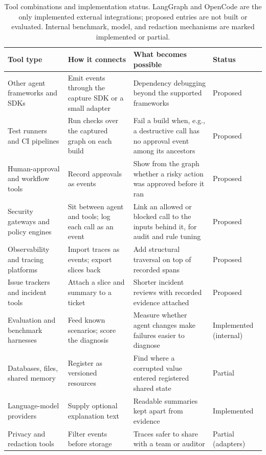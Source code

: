 \documentclass[11pt]{article}
\begin{document}
\begin{table}[h]
\centering\small
\begin{tabularx}{\linewidth}{@{}>{\raggedright\arraybackslash}p{2.4cm}>{\raggedright\arraybackslash}p{4.0cm}>{\raggedright\arraybackslash}p{4.3cm}>{\raggedright\arraybackslash}p{1.8cm}@{}}
\toprule
\textbf{Tool type} & \textbf{How it connects} & \textbf{What becomes possible} & \textbf{Status}\\
\midrule
Other agent frameworks and SDKs & Emit events through the capture SDK or a small adapter & Dependency debugging beyond the supported frameworks & Proposed\\
Test runners and CI pipelines & Run checks over the captured graph on each build & Fail a build when, e.g., a destructive call has no approval event among its ancestors & Proposed\\
Human-approval and workflow tools & Record approvals as events & Show from the graph whether a risky action was approved before it ran & Proposed\\
Security gateways and policy engines & Sit between agent and tools; log each call as an event & Link an allowed or blocked call to the inputs behind it, for audit and rule tuning & Proposed\\
Observability and tracing platforms & Import traces as events; export slices back & Add structural traversal on top of recorded spans & Proposed\\
Issue trackers and incident tools & Attach a slice and summary to a ticket & Shorter incident reviews with recorded evidence attached & Proposed\\
Evaluation and benchmark harnesses & Feed known scenarios; score the diagnosis & Measure whether agent changes make failures easier to diagnose & Implemented (internal)\\
Databases, files, shared memory & Register as versioned resources & Find where a corrupted value entered registered shared state & Partial\\
Language-model providers & Supply optional explanation text & Readable summaries kept apart from evidence & Implemented\\
Privacy and redaction tools & Filter events before storage & Traces safer to share with a team or auditor & Partial (adapters)\\
\bottomrule
\end{tabularx}
\caption{Tool combinations and implementation status. LangGraph and OpenCode are the only implemented external integrations; proposed entries are not built or evaluated. Internal benchmark, model, and redaction mechanisms are marked implemented or partial.}
\label{tab:tools}
\end{table}
\end{document}
